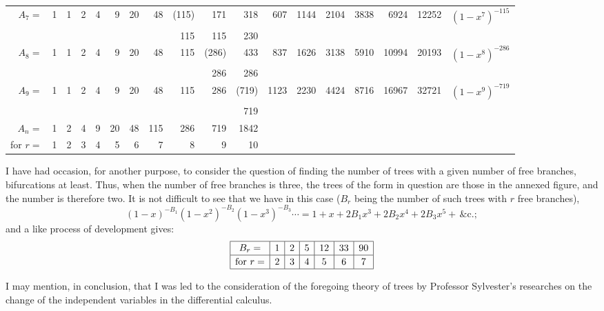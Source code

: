 \documentclass[12pt,a4paper]{article}
\theoremstyle{plain}
\begin{document}
\begin{center}
\begin{tabular}{r|rrrrrrrrrrrrrrrr|l}
\hline
$A_7=$ & 1 & 1 & 2 & 4 & 9 & 20 & 48 & (115) & 171 & 318 & 607 & 1144 & 2104 & 3838 & 6924 & 12252 & $(1-x^7)^{-115}$\\
       &   &   &   &   &   &   &   & 115 & 115 & 230 &   &   &   &   &   &   & \\
\hline
$A_8=$ & 1 & 1 & 2 & 4 & 9 & 20 & 48 & 115 & (286) & 433 & 837 & 1626 & 3138 & 5910 & 10994 & 20193 & $(1-x^8)^{-286}$\\
       &   &   &   &   &   &   &   &   & 286 & 286 &   &   &   &   &   &   & \\
\hline
$A_9=$ & 1 & 1 & 2 & 4 & 9 & 20 & 48 & 115 & 286 & (719) & 1123 & 2230 & 4424 & 8716 & 16967 & 32721 & $(1-x^9)^{-719}$\\
       &   &   &   &   &   &   &   &   &   & 719 &   &   &   &   &   &   & \\
\hline
$A_n=$ & 1 & 2 & 4 & 9 & 20 & 48 & 115 & 286 & 719 & 1842 &   &   &   &   &   &   & \\
\hline
for $r=$ & 1 & 2 & 3 & 4 & 5 & 6 & 7 & 8 & 9 & 10 &   &   &   &   &   &   & \\
\end{tabular}
\end{center}

\medskip

\noindent I have had occasion, for another purpose, to consider the question of finding the number of trees with a given number of free branches, bifurcations at least. Thus, when the number of free branches is three, the trees of the form in question are those in the annexed figure, and the number is therefore two. It is not difficult to see that we have in this case ($B_r$ being the number of such trees with $r$ free branches),
\[
(1-x)^{-B_1}(1-x^2)^{-B_2}(1-x^3)^{-B_3}\cdots=1+x+2B_1x^3+2B_2x^4+2B_3x^5+\,\&\mathrm{c}.;
\]
and a like process of development gives:
\[
\renewcommand{\arraystretch}{1.15}
\begin{array}{|c|c|c|c|c|c|c|}
\hline
B_r= & 1 & 2 & 5 & 12 & 33 & 90\\\hline
\text{for } r= & 2 & 3 & 4 & 5 & 6 & 7\\\hline
\end{array}
\]

\medskip

\noindent I may mention, in conclusion, that I was led to the consideration of the foregoing theory of trees by Professor Sylvester's researches on the change of the independent variables in the differential calculus.

\bigskip
\end{document}
